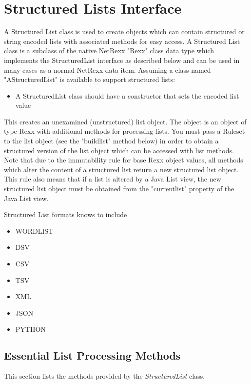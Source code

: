 \chapter{Structured Lists Interface}\label{reflists}
 
A Structured List class is used to create objects which can contain
structured or string encoded lists with associated methods for easy
access. A Structured List class is a subclass of the native NetRexx
"Rexx" class data type which implements the StructuredList interface
as described below and can be used in many cases as a normal NetRexx
data item. Assuming a class named "AStructuredList" is available to
support structured lists:

\begin{itemize}
\item A StructuredList class should have a constructor that sets the
  encoded list value
\end{itemize}
 
This creates an unexamined (unstructured) list object. The object is
an object of type Rexx with additional methods for processing lists. You
must pass a Ruleset to the list object (see the "buildlist" method
below) in order to obtain a structured version of the list object
which can be accessed with list methods. Note that due to the
immutability rule for base Rexx object values, all methods which alter
the content of a structured list return a new structured list
object. This rule also means that if a list is altered by a Java List
view, the new structured list object must be obtained from the
"currentlist" property of the Java List view. 

Structured List formats
knows to \nr{} include 
\begin{itemize}
\item WORDLIST
\item DSV
\item CSV
\item TSV
\item XML
\item JSON
\item PYTHON
\end{itemize}

\section{Essential List Processing Methods}
This section lists the methods provided by the \emph{StructuredList}
class.


